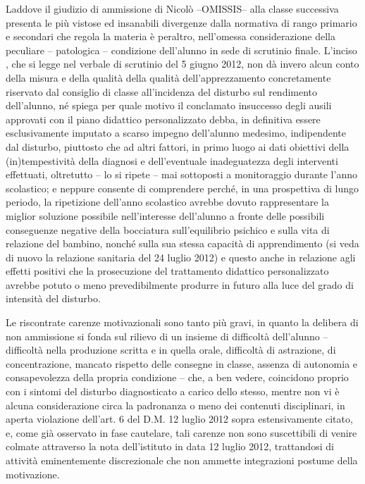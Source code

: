  Laddove il giudizio di ammissione di Nicolò --OMISSIS-- alla classe successiva presenta le più vistose ed insanabili divergenze dalla normativa di rango primario e secondari che regola la materia è peraltro, nell'omessa considerazione della peculiare -- patologica -- condizione dell'alunno in sede di scrutinio finale. L'inciso , che si legge nel verbale di scrutinio del 5 giugno 2012, non dà invero alcun conto della misura e della qualità della qualità dell'apprezzamento concretamente riservato dal consiglio di classe all'incidenza del disturbo sul rendimento dell'alunno, né spiega per quale motivo il conclamato insuccesso degli ausili approvati con il piano didattico personalizzato debba, in definitiva essere esclusivamente imputato a scarso impegno dell'alunno medesimo, indipendente dal disturbo, piuttosto che ad altri fattori, in primo luogo ai dati obiettivi della (in)tempestività della diagnosi e dell'eventuale inadeguatezza degli interventi effettuati, oltretutto -- lo si ripete -- mai sottoposti a monitoraggio durante l'anno scolastico; e neppure consente di comprendere perché, in una prospettiva di lungo periodo, la ripetizione dell'anno scolastico avrebbe dovuto rappresentare la miglior soluzione possibile nell'interesse dell'alunno a fronte delle possibili conseguenze negative della bocciatura sull'equilibrio psichico e sulla vita di relazione del bambino, nonché sulla sua stessa capacità di apprendimento (si veda di nuovo la relazione sanitaria del 24 luglio 2012) e questo anche in relazione agli effetti positivi che la prosecuzione del trattamento didattico personalizzato avrebbe potuto o meno prevedibilmente produrre in futuro alla luce del grado di intensità del disturbo.
 
 Le riscontrate carenze motivazionali sono tanto più gravi, in quanto la delibera di non ammissione si fonda sul rilievo di un insieme di difficoltà dell'alunno -- difficoltà nella produzione scritta e in quella orale, difficoltà di astrazione, di concentrazione, mancato rispetto delle consegne in classe, assenza di autonomia e consapevolezza della propria condizione -- che, a ben vedere, coincidono proprio con i sintomi del disturbo diagnosticato a carico dello stesso, mentre non vi è alcuna considerazione circa la padronanza o meno dei contenuti disciplinari, in aperta violazione dell'art. 6 del D.M. 12 luglio 2012 sopra estensivamente citato, e, come già osservato in fase cautelare, tali carenze non sono suscettibili di venire colmate attraverso la nota dell'istituto in data 12 luglio 2012, trattandosi di attività eminentemente discrezionale che non ammette integrazioni postume della motivazione.
 
